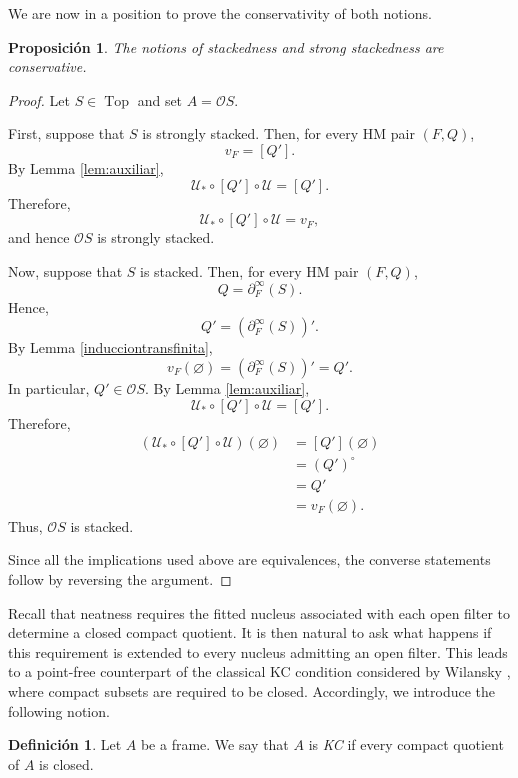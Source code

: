 \documentclass[11pt]{amsart}
\DeclareMathOperator{\Top}{Top}
\theoremstyle{plain}
\newtheorem{prop}[thm]{Proposición}
\theoremstyle{definition}
\newtheorem{dfn}[thm]{Definición}
\begin{document}
We are now in a position to prove the conservativity of both notions.

\begin{prop}\label{apiladoconservativa}
The notions of stackedness and strong stackedness are conservative.
\end{prop}

\begin{proof}
Let $S\in\Top$ and set $A=\mathcal{O}S$.

First, suppose that $S$ is strongly stacked. Then, for every HM pair
$(F,Q)$,
\[
v_F=[Q'].
\]
By Lemma \ref{lem:auxiliar},
\[
\mathcal{U}_*\circ[Q']\circ\mathcal{U}=[Q'].
\]
Therefore,
\[
\mathcal{U}_*\circ[Q']\circ\mathcal{U}=v_F,
\]
and hence $\mathcal{O}S$ is strongly stacked.

Now, suppose that $S$ is stacked. Then, for every HM pair $(F,Q)$,
\[
Q=\partial_F^\infty(S).
\]
Hence,
\[
Q'=\left(\partial_F^\infty(S)\right)'.
\]
By Lemma \ref{inducciontransfinita},
\[
v_F(\varnothing)
=\left(\partial_F^\infty(S)\right)'
=Q'.
\]
In particular, $Q'\in \mathcal{O}S$. By Lemma \ref{lem:auxiliar},
\[
\mathcal{U}_*\circ[Q']\circ\mathcal{U}=[Q'].
\]
Therefore,
\[
\begin{aligned}
(\mathcal{U}_*\circ[Q']\circ\mathcal{U})(\varnothing)
&=[Q'](\varnothing)\\
&=(Q')^\circ\\
&=Q'\\
&=v_F(\varnothing).
\end{aligned}
\]
Thus, $\mathcal{O}S$ is stacked.

Since all the implications used above are equivalences, the converse statements follow by reversing the argument.
\end{proof}


Recall that neatness requires the fitted nucleus associated with each
open filter to determine a closed compact quotient. It is then natural
to ask what happens if this requirement is extended to every nucleus
admitting an open filter. This leads to a point-free counterpart of the
classical KC condition considered by Wilansky \cite{Wilansky1967}, where compact
subsets are required to be closed. Accordingly, we introduce the
following notion.

\begin{dfn}
Let $A$ be a frame. We say that $A$ is \emph{KC} if every compact quotient of $A$ is closed.
\end{dfn}
\end{document}
